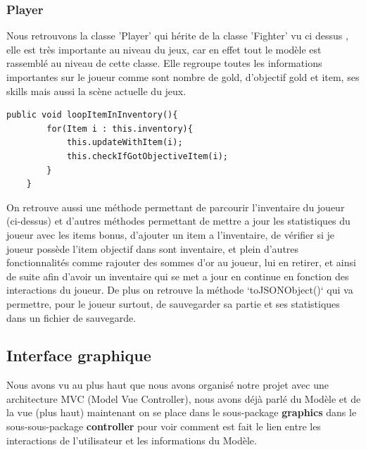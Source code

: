 \documentclass[12pt]{article}
\begin{document}
\subsubsection{Player}
Nous retrouvons la classe 'Player' qui hérite de la classe 'Fighter' vu ci dessus , elle est très importante au niveau du jeux, car en effet tout le modèle est rassemblé au niveau de cette classe.\newline
Elle regroupe toutes les informations importantes sur le joueur comme sont nombre de gold, d'objectif gold et item, ses skills mais aussi la scène actuelle du jeux.
\begin{verbatim}
public void loopItemInInventory(){
        for(Item i : this.inventory){
            this.updateWithItem(i);
            this.checkIfGotObjectiveItem(i);
        }
    }
\end{verbatim}
On retrouve aussi une méthode permettant de parcourir l'inventaire du joueur (ci-dessus) et d'autres méthodes permettant de mettre a jour les statistiques du joueur avec les items bonus, d'ajouter un item a l'inventaire, de vérifier si je joueur possède l'item objectif dans sont inventaire, et plein d'autres fonctionnalités comme rajouter des sommes d'or au joueur, lui en retirer, et ainsi de suite afin d'avoir un inventaire qui se met a jour en continue en fonction des interactions du joueur.\newline
De plus on retrouve la méthode ‘toJSONObject()‘ qui va permettre, pour le joueur surtout, de sauvegarder sa partie et ses statistiques
dans un fichier de sauvegarde.

\subsection{Interface graphique}
Nous avons vu au plus haut que nous avons organisé notre projet avec une architecture MVC (Model Vue Controller), nous avons déjà parlé du Modèle et de la vue (plus haut) maintenant on se place dans le sous-package \textbf{graphics} dans le sous-sous-package \textbf{controller} pour voir  comment est fait le lien entre les interactions de l'utilisateur et les informations du Modèle.
\end{document}
